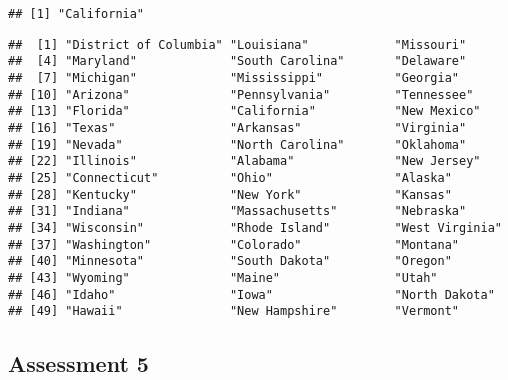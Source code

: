\documentclass[
]{article}
\newenvironment{Shaded}{\begin{snugshade}}{\end{snugshade}}
\newcommand{\CommentTok}[1]{\textcolor[rgb]{0.56,0.35,0.01}{\textit{#1}}}
\newcommand{\DataTypeTok}[1]{\textcolor[rgb]{0.13,0.29,0.53}{#1}}
\newcommand{\DecValTok}[1]{\textcolor[rgb]{0.00,0.00,0.81}{#1}}
\newcommand{\KeywordTok}[1]{\textcolor[rgb]{0.13,0.29,0.53}{\textbf{#1}}}
\newcommand{\NormalTok}[1]{#1}
\newcommand{\OperatorTok}[1]{\textcolor[rgb]{0.81,0.36,0.00}{\textbf{#1}}}
\newcommand{\OtherTok}[1]{\textcolor[rgb]{0.56,0.35,0.01}{#1}}
\newcommand{\StringTok}[1]{\textcolor[rgb]{0.31,0.60,0.02}{#1}}
\begin{document}
\begin{verbatim}
## [1] "California"
\end{verbatim}

\begin{Shaded}
\end{Shaded}

\begin{verbatim}
##  [1] "District of Columbia" "Louisiana"            "Missouri"            
##  [4] "Maryland"             "South Carolina"       "Delaware"            
##  [7] "Michigan"             "Mississippi"          "Georgia"             
## [10] "Arizona"              "Pennsylvania"         "Tennessee"           
## [13] "Florida"              "California"           "New Mexico"          
## [16] "Texas"                "Arkansas"             "Virginia"            
## [19] "Nevada"               "North Carolina"       "Oklahoma"            
## [22] "Illinois"             "Alabama"              "New Jersey"          
## [25] "Connecticut"          "Ohio"                 "Alaska"              
## [28] "Kentucky"             "New York"             "Kansas"              
## [31] "Indiana"              "Massachusetts"        "Nebraska"            
## [34] "Wisconsin"            "Rhode Island"         "West Virginia"       
## [37] "Washington"           "Colorado"             "Montana"             
## [40] "Minnesota"            "South Dakota"         "Oregon"              
## [43] "Wyoming"              "Maine"                "Utah"                
## [46] "Idaho"                "Iowa"                 "North Dakota"        
## [49] "Hawaii"               "New Hampshire"        "Vermont"
\end{verbatim}

\hypertarget{assessment-5}{%
\subsection{Assessment 5}\label{assessment-5}}
\end{document}
